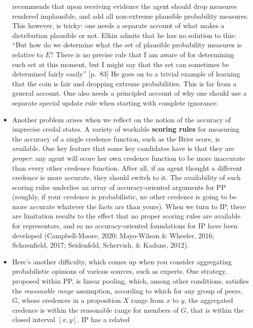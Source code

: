\documentclass[
  10pt,
  dvipsnames,enabledeprecatedfontcommands]{scrartcl}
\begin{document}
\begin{itemize}
{    recommends that upon receiving evidence the agent should drop
    measures rendered implausible, and add all non-extreme plausible
    probability measures. This however, is tricky: one needs a separate
    account of what makes a distribution plausible or not. Elkin admits
    that he has no solution to this: ``But how do we determine what the
    set of plausible probability measures is relative to \(E\)? There is
    no precise rule that I am aware of for determining such set at this
    moment, but I might say that the set can sometimes be determined
    fairly easily'' {[}p.~83{]} He goes on to a trivial example of
    learning that the coin is fair and dropping extreme probabilities.
    This is far from a general account. One also needs a principled
    account of why one should use a separate special update rule when
    starting with complete ignorance.}
\item
  Another problem arises when we reflect on the notion of the accuracy
  of imprecise credal states. A variety of workable
  \textbf{scoring rules} for measuring the accuracy of a single credence
  function, such as the Brier score, is available. One key feature that
  some key candidates have is that they are \emph{proper}: any agent
  will score her own credence function to be more inaccurate than every
  other credence function. After all, if an agent thought a different
  credence is more accurate, they should switch to it. The availability
  of such scoring rules underlies an array of accuracy-oriented
  arguments for \textsf{PP} (roughly, if your credence is probabilistic,
  no other credence is going to be more accurate whatever the facts are
  than yours). When we turn to \textsf{IP}, there are limitation results
  to the effect that no proper scoring rules are available for
  representors, and so no accuracy-oriented foundations for IP have been
  developed (Campbell-Moore, 2020; Mayo-Wilson \& Wheeler, 2016;
  Schoenfield, 2017; Seidenfeld, Schervish, \& Kadane, 2012).
\item
  Here's another difficulty, which comes up when you consider
  aggregating probabilistic opinions of various sources, such as
  experts. One strategy, proposed within PP, is linear pooling, which,
  among other conditions, satisfies the \emph{reasonable  range}
  assumption, according to which for any group of peers, \(G\), whose
  credences in a proposition \(X\) range from \(x\) to \(y\), the
  aggregated credence is within the reasonable range for members of
  \(G\), that is within the closed interval \([x, y]\). IP has a related

\end{itemize}
\end{document}
